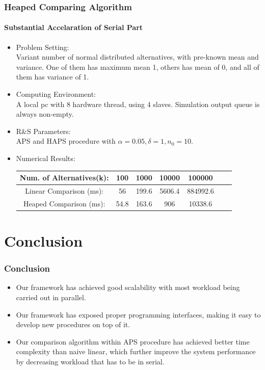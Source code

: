\documentclass{beamer}
\begin{document}
\begin{frame}
\frametitle{Heaped Comparing Algorithm}
\framesubtitle{Substantial Accelaration of Serial Part}
\begin{itemize}
\item {Problem Setting: } \\ Variant number of normal distributed alternatives, with pre-known mean and variance. One of them has maximum mean 1, others has mean of 0, and all of them has variance of 1.
\item {Computing Environment: } \\ A local pc with 8 hardware thread, using 4 slaves. Simulation output queue is always non-empty.
\item {R\&S Parameters: } \\ APS and HAPS procedure with $\alpha=0.05, \delta=1, n_0 = 10$.
\item {Numerical Results: }
\begin{table}[ht]
\begin{center}
\scalebox{0.85}
{
\begin{tabular}{|c|c|c|c|c|c|c|}
\hline
Num. of Alternatives(k): & 100 & 1000 & 10000 & 100000 \\
\hline
Linear Comparison (ms): & 56 & 199.6 & 5606.4 & 884992.6 \\
\hline
Heaped Comparison (ms): & 54.8 & 163.6 & 906 & 10338.6 \\
\hline
\end{tabular}
}
\end{center}
\end{table}
\end{itemize}
\end{frame}

\section{Conclusion}

\begin{frame}
\frametitle{Conclusion}
\begin{itemize}
\item Our framework has achieved good scalability with most workload being carried out in parallel.
\vspace{\baselineskip}
\item Our framework has exposed proper programming interfaces, making it easy to develop new procedures on top of it.
\vspace{\baselineskip}
\item Our comparison algorithm within APS procedure has achieved better time complexity than naive linear, which further improve the system performance by decreasing workload that has to be in serial.
\end{itemize}
\end{frame}
\end{document}
